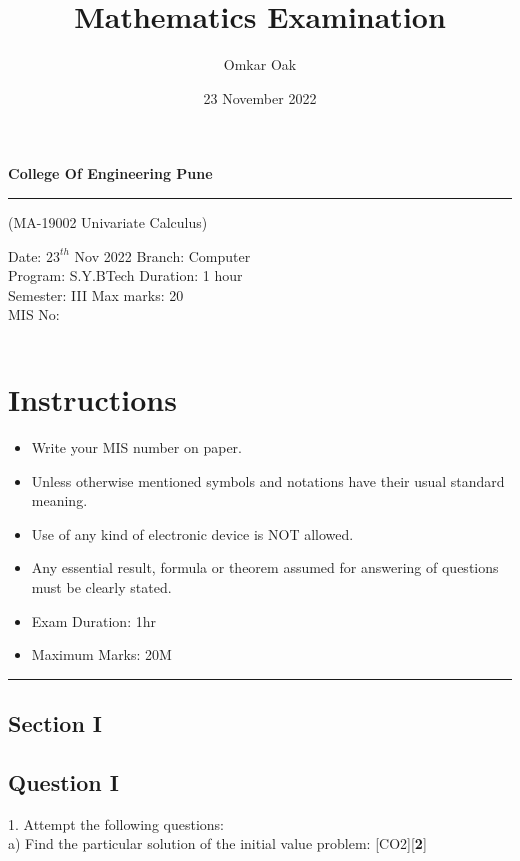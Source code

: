 \documentclass{article}
\author{Omkar Oak}
\title{\vspace{-5cm} Mathematics Examination}
\date{23 November 2022}
\begin{document}
	\maketitle
	\begin{center}
	\textbf{\Large College Of Engineering Pune}
	\end{center}
	\rule{\textwidth}{0.4pt}
	\begin{center}
	(MA-19002 Univariate Calculus)
	\end{center}
	Date: $23^{th}$ Nov 2022 \hspace{50 mm} Branch: Computer\\
	Program: S.Y.BTech \hspace{50 mm} Duration: 1 hour\\
	Semester: III \hspace{62 mm} Max marks: 20\\
	MIS No: 
	\begin{table}[h]
		
	\begin{tabular}{|l|c|c|c|c|c|c|c|c|r|}
	\hline
	 & & & & & & & & & \\
	\hline
	 \end{tabular}
	\end{table}
	\vspace{-6 mm}
	\section*{Instructions}
	\begin{itemize}
	\item Write your MIS number on paper.
	\item Unless otherwise mentioned symbols and notations have their usual standard meaning.
	\item Use of any kind of electronic device is NOT allowed.
	\item Any essential result, formula or theorem assumed for answering of questions must be clearly stated.
	\item Exam Duration: 1hr
	\item Maximum Marks: 20M
	\end{itemize}
	\hrule
	\begin{center}
\section*{Section I}
\end{center}
\subsection*{Question I}
1. Attempt the following questions:\\
a) Find the particular solution of the initial value problem: \hfill [CO2][{\bf 2}]
	
\end{document}
